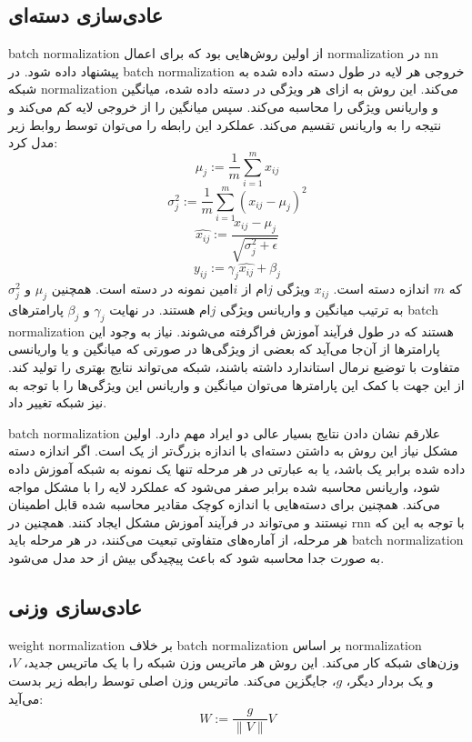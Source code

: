 \subsection{عادی‌سازی دسته‌ای}
\gls{batch normalization}\cite{ioffe2015batch} از اولین روش‌هایی بود که برای
اعمال \gls{normalization} در \gls{nn} پیشنهاد داده شود. در \gls{batch
normalization} خروجی هر لایه در طول دسته داده شده به شبکه \gls{normalization}
می‌کند. این روش به ازای هر ویژگی در دسته داده شده، میانگین و واریانس ویژگی را
محاسبه می‌کند. سپس میانگین را از خروجی لایه کم می‌کند و نتیجه را به واریانس
تقسیم می‌کند. عملکرد این رابطه را می‌توان توسط روابط زیر مدل کرد:
\begin{equation}
    \mu_j := \frac{1}{m} \sum_{i=1}^{m}x_{ij}
\end{equation}
\begin{equation}
    \sigma_j^2 := \frac{1}{m} \sum_{i=1}^{m}(x_{ij} - \mu_j)^2
\end{equation}
\begin{equation}
    \hat{x_{ij}} := \frac{x_{ij} - \mu_j}{\sqrt{\sigma_j^2 + \epsilon}}
\end{equation}
\begin{equation}
    y_{ij} := \gamma_j \hat{x_{ij}} + \beta_j
\end{equation}
که $m$ اندازه دسته است. $x_{ij}$ ویژگی $j$ام از $i$امین نمونه در دسته است.
همچنین $\mu_j$ و $\sigma_j^2$ به ترتیب میانگین و واریانس ویژگی $j$ام هستند. در
نهایت $\gamma_j$ و $\beta_j$ پارامترهای \gls{batch normalization} هستند که در
طول فرآیند آموزش فراگرفته می‌شوند. نیاز به وجود این پارامترها از آن‌جا می‌آید که
بعضی از ویژگی‌ها در صورتی که میانگین و یا واریانسی متفاوت با توضیع نرمال
استاندارد داشته باشند، شبکه می‌تواند نتایج بهتری را تولید کند. از این جهت با کمک
این پارامترها می‌توان میانگین و واریانس این ویژگی‌ها را با توجه به نیز شبکه
تغییر داد.

\gls{batch normalization} علارقم نشان دادن نتایج بسیار عالی دو ایراد مهم دارد.
اولین مشکل نیاز این روش به داشتن دسته‌ای با اندازه بزرگ‌تر از یک است. اگر اندازه
دسته داده شده برابر یک باشد، یا به عبارتی در هر مرحله تنها یک نمونه به شبکه
آموزش داده شود، واریانس محاسبه شده برابر صفر می‌شود که عملکرد لایه را با مشکل
مواجه می‌کند. همچنین برای دسته‌هایی با اندازه کوچک مقادیر محاسبه شده قابل
اطمینان نیستند و می‌تواند در فرآیند آموزش مشکل ایجاد کنند. همچنین در \gls{rnn}
با توجه به این که هر مرحله، از آماره‌های متفاوتی تبعیت می‌کنند، در هر مرحله باید
\gls{batch normalization} به صورت جدا محاسبه شود که باعث پیچیدگی بیش از حد مدل
می‌شود.

\subsection{عادی‌سازی وزنی}
\gls{weight normalization}\cite{salimans2016weight} بر خلاف \gls{batch
normalization} بر اساس \gls{normalization} وزن‌های شبکه کار می‌کند. این روش هر
ماتریس وزن شبکه را با یک ماتریس جدید، $V$، و یک بردار دیگر، $g$، جایگزین می‌کند.
ماتریس وزن اصلی توسط رابطه زیر بدست می‌آید:
\begin{equation}
    W := \frac{g}{\parallel V \parallel} V
\end{equation}

